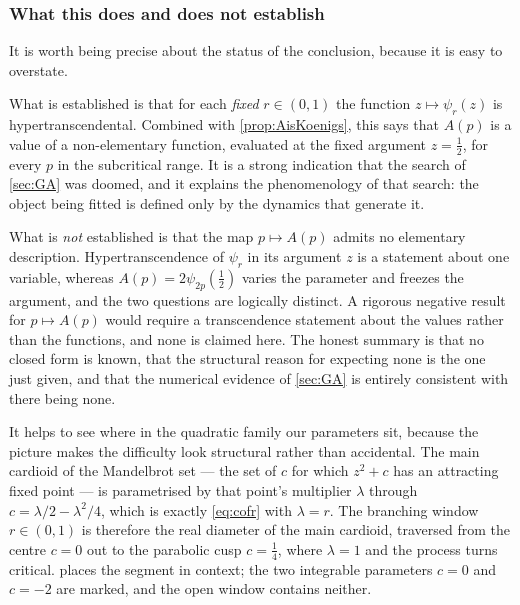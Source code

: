 \subsubsection*{What this does and does not establish}

It is worth being precise about the status of the conclusion, because it is easy to
overstate.

What is established is that for each \emph{fixed} $r\in(0,1)$ the function
$z\mapsto\psi_r(z)$ is hypertranscendental. Combined with \cref{prop:AisKoenigs}, this
says that $A(p)$ is a value of a non-elementary function, evaluated at the fixed argument
$z=\tfrac12$, for every $p$ in the subcritical range. It is a strong indication that the
search of \cref{sec:GA} was doomed, and it explains the phenomenology of that search: the
object being fitted is defined only by the dynamics that generate it.

What is \emph{not} established is that the map $p\mapsto A(p)$ admits no elementary
description. Hypertranscendence of $\psi_r$ in its argument $z$ is a statement about one
variable, whereas $A(p) = 2\psi_{2p}(\tfrac12)$ varies the parameter and freezes the
argument, and the two questions are logically distinct. A rigorous negative result for
$p\mapsto A(p)$ would require a transcendence statement about the values rather than the
functions, and none is claimed here. The honest summary is that no closed form is known,
that the structural reason for expecting none is the one just given, and that the
numerical evidence of \cref{sec:GA} is entirely consistent with there being none.

It helps to see where in the quadratic family our parameters sit, because the picture makes
the difficulty look structural rather than accidental. The main cardioid of the Mandelbrot
set --- the set of $c$ for which $z^2+c$ has an attracting fixed point --- is parametrised
by that point's multiplier $\lambda$ through $c = \lambda/2-\lambda^2/4$, which is exactly
\cref{eq:cofr} with $\lambda=r$. The branching window $r\in(0,1)$ is therefore the real
diameter of the main cardioid, traversed from the centre $c=0$ out to the parabolic cusp
$c=\tfrac14$, where $\lambda=1$ and the process turns critical. 
places the segment in context; the two integrable parameters $c=0$ and $c=-2$ are marked,
and the open window contains neither.


